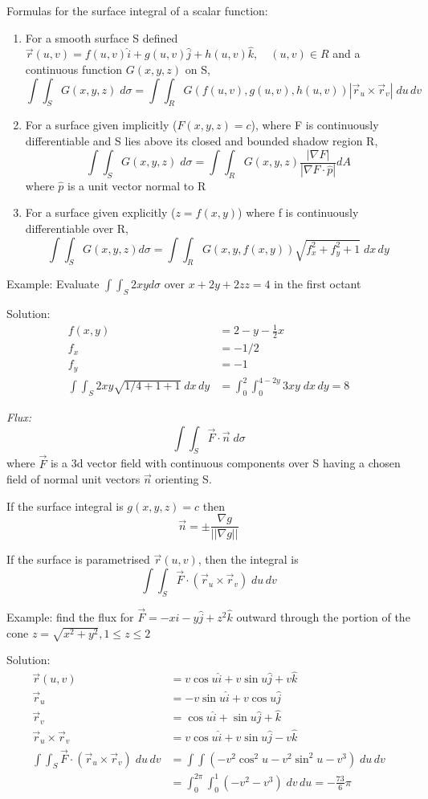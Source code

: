 \documentclass[12pt]{article}
\begin{document}
Formulas for the surface integral of a scalar function:
\begin{enumerate}
    \item For a smooth surface S defined $\vec{r}(u,v) = f(u,v) \hat{i} + g(u,v) \hat{j} + h(u,v) \hat{k}, \quad (u,v) \in R$ and a continuous function $G(x,y,z)$ on S,
    \[\int \int_S G(x,y,z) \; d\sigma = \int \int_R G(f(u,v), g(u,v), h(u,v)) |\vec{r}_u \times \vec{r}_v| \; du\, dv\]
    \item For a surface given implicitly ($F(x,y,z) = c$), where F is continuously differentiable and S lies above its closed and bounded shadow region R, 
    \[\int \int_S G(x,y,z) \; d\sigma = \int \int_R G(x,y,z) \frac{|\nabla F|}{|\nabla F \cdot \hat{p}|} dA\]
    where $\hat{p}$ is a unit vector normal to R
    \item For a surface given explicitly ($z = f(x,y)$) where f is continuously differentiable over R, 
    \[\int \int_S G(x,y,z) d\sigma = \int \int_R G(x,y, f(x,y)) \sqrt{f_x^2 + f_y^2 + 1} \; dx \, dy\]
\end{enumerate}

Example: Evaluate $\int \int_S 2xy d\sigma$ over $x + 2y + 2zz =4$ in the first octant

Solution: 
\begin{align*}
    f(x,y) &= 2 - y - \frac{1}{2}x\\
    f_x &= -1/2\\
    f_y &= -1\\
    \int \int_S 2xy\sqrt{1/4 + 1 + 1} \; dx \, dy &= \int_0^2 \int_0^{4-2y} 3xy \; dx\, dy = 8
\end{align*}

\emph{Flux:} 
\[\int \int_S \vec{F} \cdot \vec{n} \; d\sigma\]
where $\vec{F}$ is a 3d vector field with continuous components over S having a chosen field of normal unit vectors $\vec{n}$ orienting S.

If the surface integral is $g(x,y,z) = c$ then 
\[\vec{n} = \pm \frac{\nabla g}{||\nabla g||}\]

If the surface is parametrised $\vec{r}(u,v)$, then the integral is 
\[\int \int_S \vec{F} \cdot (\vec{r}_u \times \vec{r}_v) \; du\, dv\]

Example: find the flux for $\vec{F} = -x \hat{i} - y\hat{j} +z^2 \hat{k}$ outward through the portion of the cone $z = \sqrt{x^2 + y^2}, 1 \leq z \leq 2$

Solution:
\begin{align*}
    \vec{r}(u,v) &= v\cos u \hat{i} + v \sin u \hat{j} + v \hat{k} \\
    \vec{r}_u &= - v\sin u \hat{i} + v\cos u \hat{j}\\
    \vec{r}_v &= \cos u \hat{i} + \sin u \hat{j} + \hat{k}\\
    \vec{r}_u \times \vec{r}_v &= v\cos u \hat{i} + v\sin u \hat{j} - v\hat{k}\\
    \int \int_S \vec{F} \cdot (\vec{r}_u \times \vec{r}_v) \; du \, dv &= \int \int (-v^2 \cos^2 u- v^2 \sin^2 u - v^3)\; du\, dv \\
    &= \int_0^{2\pi} \int_0^1 (-v^2 - v^3) \; dv \, du = -\frac{73}{6}\pi
\end{align*}
\end{document}
